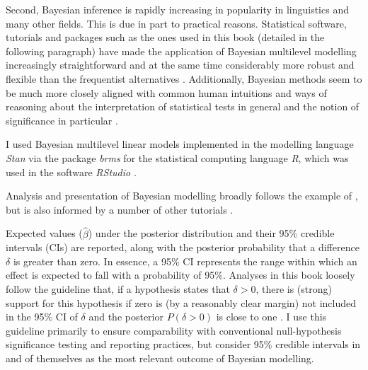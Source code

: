 Second, Bayesian inference is rapidly increasing in popularity in linguistics and many other fields. This is due in part to practical reasons. Statistical software, tutorials and packages such as the ones used in this book (detailed in the following paragraph) have made the application of Bayesian multilevel modelling increasingly straightforward and at the same time considerably more robust and flexible than the frequentist alternatives \citep{eagerMixedEffectsModels2017}. Additionally, Bayesian methods seem to be much more closely aligned with common human intuitions and ways of reasoning about the interpretation of statistical tests in general and the notion of significance in particular \citep{dienesBayesianOrthodoxStatistics2011, mcshaneStatisticalSignificanceDichotomization2017, winterPoissonRegressionLinguists2021a}.

I used Bayesian multilevel linear models implemented in the modelling language \emph{Stan} \citep{carpenterStanProbabilisticProgramming2017} via the package \emph{brms} for the statistical computing language \emph{R}, which was used in the software \emph{RStudio} \citep{burknerBrmsPackageBayesian2017, rcoreteamLanguageEnvironmentStatistical2022, rstudioteamRStudioIntegratedDevelopment2021}.

Analysis and presentation of Bayesian modelling broadly follows the example of \citet{frankeBayesianRegressionModeling2019}, but is also informed by a number of other tutorials \citep{mcelreathStatisticalRethinkingBayesian2020, vasishthBayesianDataAnalysis2018, winterPoissonRegressionLinguists2021a}.

Expected values (\(\hat{\beta}\)) under the posterior distribution and their 95\% credible intervals (CIs) are reported, along with the posterior probability that a difference \(\delta\) is greater than zero. In essence, a 95\% CI represents the range within which an effect is expected to fall with a probability of 95\%. Analyses in this book loosely follow the guideline that, if a hypothesis states that \(\delta > 0\), there is (strong) support for this hypothesis if zero is (by a reasonably clear margin) not included in the 95\% CI of \(\delta\) and the posterior \(P(\delta > 0)\) is close to one \citep[cf.][]{frankeBayesianRegressionModeling2019}. I use this guideline primarily to ensure comparability with conventional null-hypothesis significance testing and reporting practices, but consider 95\% credible intervals in and of themselves as the most relevant outcome of Bayesian modelling.

